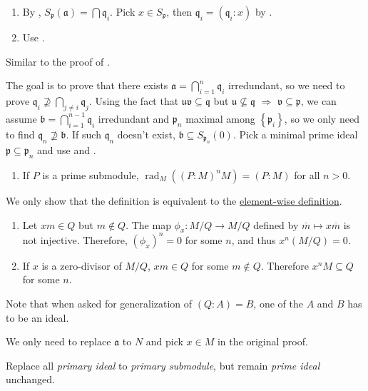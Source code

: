 \begin{exercise}\label{ex4.18}
	\begin{enumerate}
		\item[(i) $\Rightarrow$ (L1)] By , $S_\mathfrak{p}(\mathfrak{a})=\bigcap\mathfrak{q}_i$. Pick $x\in S_\mathfrak{p}$, then $\mathfrak{q}_i=\left(\mathfrak{q}_i:x\right)$ by .
		\item[(i) $\Rightarrow$ (L2)] Use .
	\end{enumerate}
\end{exercise}

\begin{exercise}\label{ex4.19}
	Similar to the proof of .
	
	The goal is to prove that there exists $\mathfrak{a}=\bigcap_{i=1}^n\mathfrak{q}_i$ irredundant, so we need to prove $\mathfrak{q}_i\nsupseteq\bigcap_{j\neq i}\mathfrak{q}_j$. Using the fact that $\mathfrak{uv}\subseteq\mathfrak{q}$ but $\mathfrak{u}\nsubseteq\mathfrak{q}$ $\Rightarrow$ $\mathfrak{v}\subseteq\mathfrak{p}$, we can assume $\mathfrak{b}=\bigcap_{i=1}^{n-1}\mathfrak{q}_i$ irredundant and $\mathfrak{p}_n$ maximal among $\left\{\mathfrak{p}_i\right\}$, so we only need to find $\mathfrak{q}_n\nsupseteq\mathfrak{b}$. If such $\mathfrak{q}_n$ doesn't exist, $\mathfrak{b}\subseteq S_{\mathfrak{p}_n}(0)$. Pick a minimal prime ideal $\mathfrak{p}\subseteq\mathfrak{p}_n$ and use  and .
\end{exercise}

\begin{exercise}\label{ex4.20}
	\begin{enumerate}
		\item[(vi)] If $P$ is a prime submodule, $\operatorname{rad}_M\left((P:M)^nM\right)=(P:M)$ for all $n>0$.
	\end{enumerate}
\end{exercise}

\begin{exercise}\label{ex4.21}
	We only show that the definition is equivalent to the \hyperref[primarymodule]{element-wise definition}.
	\begin{enumerate}
		\item[$\Rightarrow$:] Let $xm\in Q$ but $m\notin Q$. The map $\phi_x:M/Q\rightarrow M/Q$ defined by $\overline{m}\mapsto x\overline{m}$ is not injective. Therefore, $\left(\phi_x\right)^n=0$ for some $n$, and thus $x^n(M/Q)=0$.
		\item[$\Leftarrow$:] If $x$ is a zero-divisor of $M/Q$, $xm\in Q$ for some $m\notin Q$. Therefore $x^nM\subseteq Q$ for some $n$.
	\end{enumerate}
	
	Note that when asked for generalization of $(Q:A)=B$, one of the $A$ and $B$ has to be an ideal.
\end{exercise}

\begin{exercise}\label{ex4.22}
	We only need to replace $\mathfrak{a}$ to $N$ and pick $x\in M$ in the original proof.
\end{exercise}

\begin{exercise}\label{ex4.23}
	Replace all \textit{primary ideal} to \textit{primary submodule}, but remain \textit{prime ideal} unchanged.
\end{exercise}